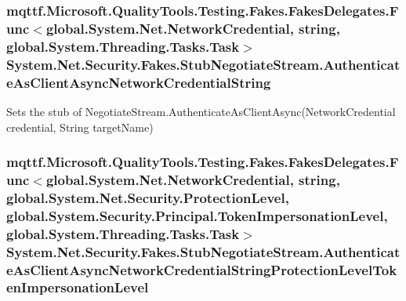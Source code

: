 \hypertarget{class_system_1_1_net_1_1_security_1_1_fakes_1_1_stub_negotiate_stream_a0a6a03a299a26eb139ee75b6a81619bd}{
\subsubsection[{Authenticate\-As\-Client\-Async\-Network\-Credential\-String}]{\setlength{\rightskip}{0pt plus 5cm}mqttf.\-Microsoft.\-Quality\-Tools.\-Testing.\-Fakes.\-Fakes\-Delegates.\-Func$<$global.\-System.\-Net.\-Network\-Credential, string, global.\-System.\-Threading.\-Tasks.\-Task$>$ System.\-Net.\-Security.\-Fakes.\-Stub\-Negotiate\-Stream.\-Authenticate\-As\-Client\-Async\-Network\-Credential\-String}}\label{class_system_1_1_net_1_1_security_1_1_fakes_1_1_stub_negotiate_stream_a0a6a03a299a26eb139ee75b6a81619bd}


Sets the stub of Negotiate\-Stream.\-Authenticate\-As\-Client\-Async(\-Network\-Credential credential, String target\-Name)

\hypertarget{class_system_1_1_net_1_1_security_1_1_fakes_1_1_stub_negotiate_stream_a3a6f034108b4644c9d9a468dff21638a}{
\subsubsection[{Authenticate\-As\-Client\-Async\-Network\-Credential\-String\-Protection\-Level\-Token\-Impersonation\-Level}]{\setlength{\rightskip}{0pt plus 5cm}mqttf.\-Microsoft.\-Quality\-Tools.\-Testing.\-Fakes.\-Fakes\-Delegates.\-Func$<$global.\-System.\-Net.\-Network\-Credential, string, global.\-System.\-Net.\-Security.\-Protection\-Level, global.\-System.\-Security.\-Principal.\-Token\-Impersonation\-Level, global.\-System.\-Threading.\-Tasks.\-Task$>$ System.\-Net.\-Security.\-Fakes.\-Stub\-Negotiate\-Stream.\-Authenticate\-As\-Client\-Async\-Network\-Credential\-String\-Protection\-Level\-Token\-Impersonation\-Level}}\label{class_system_1_1_net_1_1_security_1_1_fakes_1_1_stub_negotiate_stream_a3a6f034108b4644c9d9a468dff21638a}



